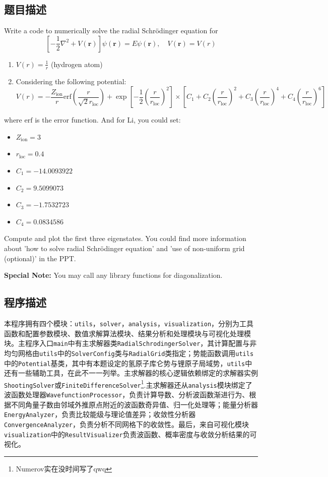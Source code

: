 \subsection{题目描述}
\noindent Write a code to numerically solve the radial Schrödinger equation for
\[
\left[-\frac{1}{2}\nabla^2+V(\mathbf{r})\right]\psi(\mathbf{r})=E\psi(\mathbf{r}), \quad V(\mathbf{r})=V(r)
\]
\begin{enumerate}
    \item \( V(r) = \frac{1}{r} \) (hydrogen atom)
    \item Considering the following potential:
    \[
    V(r) = -\frac{Z_{\text{ion}}}{r}\text{erf}\left(\frac{r}{\sqrt{2} r_{\text{loc}}}\right) 
    + \exp \left[ -\frac{1}{2} \left(\frac{r}{r_{\text{loc}}}\right)^{2}\right]
    \times \left[C_1 + C_2\left(\frac{r}{r_{\text{loc}}}\right)^2+C_3\left(\frac{r}{r_{\text{loc}}}\right)^4+C_4\left(\frac{r}{r_{\text{loc}}}\right)^6\right]
    \]
\end{enumerate}
where \(\text{erf}\) is the error function. And for Li, you could set:
\begin{itemize}
    \item \( Z_{\text{ion}}=3 \)
    \item \( r_{\text{loc}}=0.4 \)
    \item \( C_1=-14.0093922 \)
    \item \( C_2=9.5099073 \)
    \item \( C_3=-1.7532723 \)
    \item \( C_4=0.0834586 \)
\end{itemize}
\noindent Compute and plot the first three eigenstates. You could find more information about 'how to solve radial Schrödinger equation' and 'use of non-uniform grid (optional)' in the PPT.

\textbf{Special Note:} You may call any library functions for diagonalization.


\subsection{程序描述}
本程序拥有四个模块：\texttt{utils}，\texttt{solver}，\texttt{analysis}，\texttt{visualization}，分别为工具函数和配置参数模块、数值求解算法模块、结果分析和处理模块与可视化处理模块。主程序入口\texttt{main}中有主求解器类\texttt{RadialSchrodingerSolver}，其计算配置与非均匀网格由\texttt{utils}中的\texttt{SolverConfig}类与\texttt{RadialGrid}类指定；势能函数调用\texttt{utils}中的\texttt{Potential}基类，其中有本题设定的氢原子库仑势与锂原子局域势，\texttt{utils}中还有一些辅助工具，在此不一一列举。主求解器的核心逻辑依赖绑定的求解器实例\texttt{ShootingSolver}或\texttt{FiniteDifferenceSolver}\footnote{Numerov实在没时间写了qwq}.主求解器还从\texttt{analysis}模块绑定了波函数处理器\texttt{WavefunctionProcessor}，负责计算导数、分析波函数渐进行为、根据不同角量子数由邻域外推原点附近的波函数奇异值、归一化处理等；能量分析器\texttt{EnergyAnalyzer}，负责比较能级与理论值差异；收敛性分析器\texttt{ConvergenceAnalyzer}，负责分析不同网格下的收敛性。最后，来自可视化模块\texttt{visualization}中的\texttt{ResultVisualizer}负责波函数、概率密度与收敛分析结果的可视化。
